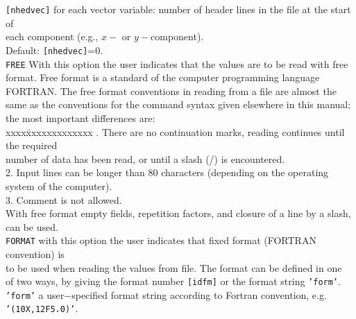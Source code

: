 \documentclass[12pt]{book}
\begin{document}
\begin{tabbing}
{\tt [nhedvec]}     \> for each vector variable: number of header lines in the file at the start of\+\\
                       each component (e.g., $x-$ or $y-$component).\\
                       Default: {\tt [nhedvec]}=0.\-\\
{\tt FREE}          \> With this option the user indicates that the values are to be read with free\+\\
                       format. Free format is a standard of the computer programming language\\
                       FORTRAN. The free format conventions in reading from a file are almost the\\
                       same as the conventions for the command syntax given elsewhere in this manual;\\
                       the most important differences are:\\
                       \pushtabs
                       xxxx\=xxxxxxxxxxxxx . \> There are no continuation marks, reading continues until the required\+\\
                             number of data has been read, or until a slash (/) is encountered.\-\\
                       2. \> Input lines can be longer than 80 characters (depending on the operating\+\\
                             system of the computer).\-\\
                       3. \> Comment is not allowed.\\
                       \poptabs
                       With free format empty fields, repetition factors, and closure of a line by a slash,\\
                       can be used.\-\\
{\tt FORMAT}        \> with this option the user indicates that fixed format (FORTRAN convention) is\+\\
                       to be used when reading the values from file. The format can be defined in one\\
                       of two ways, by giving the format number {\tt [idfm]} or the format string {\tt 'form'}.\-\\
{\tt 'form'}        \> a user$-$specified format string according to Fortran convention, e.g.\+\\
                       {\tt '(10X,12F5.0)'}.\-\\

\end{tabbing}
\end{document}

